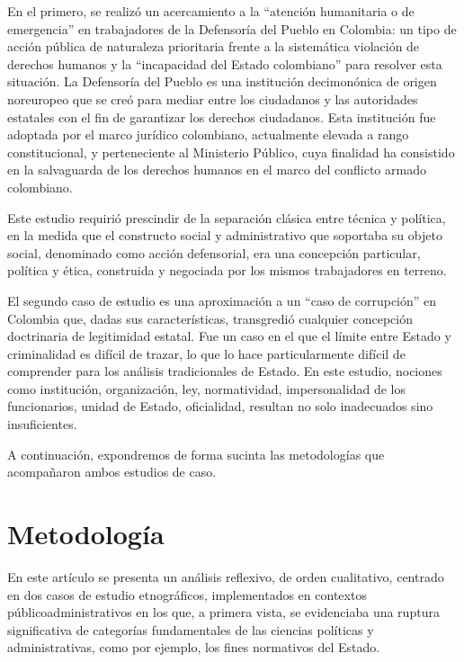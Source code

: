 \documentclass[
  spanish,
  11pt,
  a4paper,
]{scrbook}
\begin{document}
En el primero, se realizó un acercamiento a la ``atención humanitaria o
de emergencia'' en trabajadores de la Defensoría del Pueblo en Colombia:
un tipo de acción pública de naturaleza prioritaria frente a la
sistemática violación de derechos humanos y la ``incapacidad del Estado
colombiano'' para resolver esta situación. La Defensoría del Pueblo es
una institución decimonónica de origen noreuropeo que se creó para
mediar entre los ciudadanos y las autoridades estatales con el fin de
garantizar los derechos ciudadanos. Esta institución fue adoptada por el
marco jurídico colombiano, actualmente elevada a rango constitucional, y
perteneciente al Ministerio Público, cuya finalidad ha consistido en la
salvaguarda de los derechos humanos en el marco del conflicto armado
colombiano.

Este estudio requirió prescindir de la separación clásica entre técnica
y política, en la medida que el constructo social y administrativo que
soportaba su objeto social, denominado como acción defensorial, era una
concepción particular, política y ética, construida y negociada por los
mismos trabajadores en terreno.

El segundo caso de estudio es una aproximación a un ``caso de
corrupción'' en Colombia que, dadas sus características, transgredió
cualquier concepción doctrinaria de legitimidad estatal. Fue un caso en
el que el límite entre Estado y criminalidad es difícil de trazar, lo
que lo hace particularmente difícil de comprender para los análisis
tradicionales de Estado. En este estudio, nociones como institución,
organización, ley, normatividad, impersonalidad de los funcionarios,
unidad de Estado, oficialidad, resultan no solo inadecuados sino
insuficientes.

A continuación, expondremos de forma sucinta las metodologías que
acompañaron ambos estudios de caso.

\section*{Metodología}\label{metodologuxeda-1}


En este artículo se presenta un análisis reflexivo, de orden
cualitativo, centrado en dos casos de estudio etnográficos,
implementados en contextos públicoadministrativos en los que, a primera
vista, se evidenciaba una ruptura significativa de categorías
fundamentales de las ciencias políticas y administrativas, como por
ejemplo, los fines normativos del Estado.~
\end{document}
